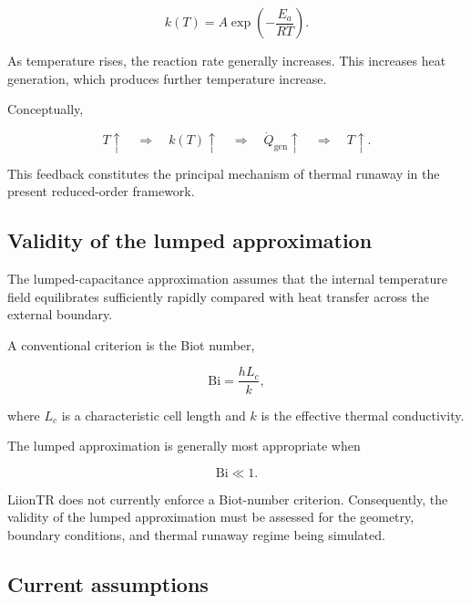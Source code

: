 \begin{equation}
    k(T)
    =
    A
    \exp
    \left(
        -\frac{E_a}{RT}
    \right).
\end{equation}

As temperature rises, the reaction rate generally increases. This
increases heat generation, which produces further temperature increase.

Conceptually,

\begin{equation}
    T
    \uparrow
    \quad \Longrightarrow \quad
    k(T)
    \uparrow
    \quad \Longrightarrow \quad
    \dot{Q}_{\mathrm{gen}}
    \uparrow
    \quad \Longrightarrow \quad
    T
    \uparrow.
\end{equation}

This feedback constitutes the principal mechanism of thermal runaway in
the present reduced-order framework.


\subsection{Validity of the lumped approximation}

The lumped-capacitance approximation assumes that the internal
temperature field equilibrates sufficiently rapidly compared with heat
transfer across the external boundary.

A conventional criterion is the Biot number,

\begin{equation}
    \mathrm{Bi}
    =
    \frac{
        h L_c
    }{
        k
    },
\end{equation}

where $L_c$ is a characteristic cell length and $k$ is the effective
thermal conductivity.

The lumped approximation is generally most appropriate when

\begin{equation}
    \mathrm{Bi}
    \ll
    1.
\end{equation}

LiionTR does not currently enforce a Biot-number criterion. Consequently,
the validity of the lumped approximation must be assessed for the
geometry, boundary conditions, and thermal runaway regime being
simulated.


\subsection{Current assumptions}

